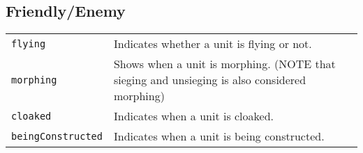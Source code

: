 \subsection{Friendly/Enemy}
\label{unitConditions}
\begin{tabularx}{\textwidth}{lX}
\verb|flying| & Indicates whether a unit is flying or not. \\
\verb|morphing| & Shows when a unit is morphing. (NOTE that sieging and unsieging is also considered morphing) \\
\verb|cloaked| & Indicates when a unit is cloaked. \\
\verb|beingConstructed| & Indicates when a unit is being constructed. \\
\end{tabularx} \\